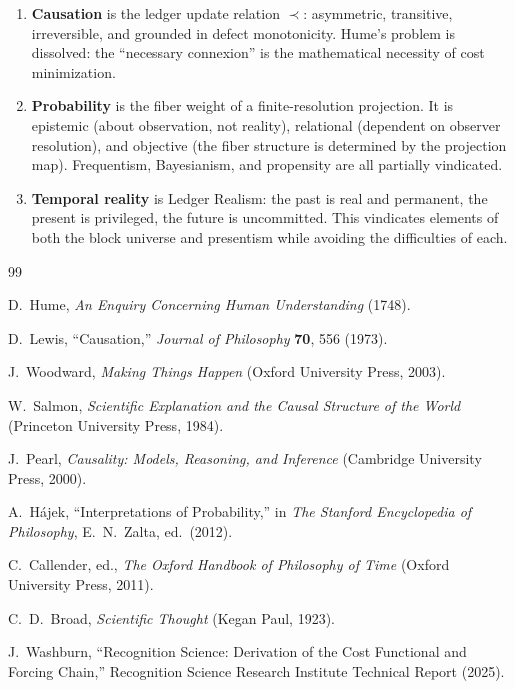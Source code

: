 \documentclass[12pt,a4paper]{article}
\theoremstyle{definition}
\theoremstyle{remark}
\begin{document}
\begin{enumerate}[nosep]
  \item \textbf{Causation} is the ledger update relation $\prec$:
  asymmetric, transitive, irreversible, and grounded in defect
  monotonicity.  Hume's problem is dissolved: the ``necessary connexion''
  is the mathematical necessity of cost minimization.

  \item \textbf{Probability} is the fiber weight of a finite-resolution
  projection.  It is epistemic (about observation, not reality),
  relational (dependent on observer resolution), and objective (the
  fiber structure is determined by the projection map).  Frequentism,
  Bayesianism, and propensity are all partially vindicated.

  \item \textbf{Temporal reality} is Ledger Realism: the past is real
  and permanent, the present is privileged, the future is uncommitted.
  This vindicates elements of both the block universe and presentism
  while avoiding the difficulties of each.
\end{enumerate}

\begin{thebibliography}{99}

D.~Hume, \emph{An Enquiry Concerning Human Understanding} (1748).

D.~Lewis, ``Causation,'' \emph{Journal of Philosophy} \textbf{70}, 556
(1973).

J.~Woodward, \emph{Making Things Happen} (Oxford University Press,
2003).

W.~Salmon, \emph{Scientific Explanation and the Causal Structure of the
World} (Princeton University Press, 1984).

J.~Pearl, \emph{Causality: Models, Reasoning, and Inference} (Cambridge
University Press, 2000).

A.~H\'ajek, ``Interpretations of Probability,'' in \emph{The Stanford
Encyclopedia of Philosophy}, E.~N.~Zalta, ed.\ (2012).

C.~Callender, ed., \emph{The Oxford Handbook of Philosophy of Time}
(Oxford University Press, 2011).

C.~D.~Broad, \emph{Scientific Thought} (Kegan Paul, 1923).

J.~Washburn, ``Recognition Science: Derivation of the Cost
Functional and Forcing Chain,'' Recognition Science Research
Institute Technical Report (2025).

\end{thebibliography}
\end{document}
